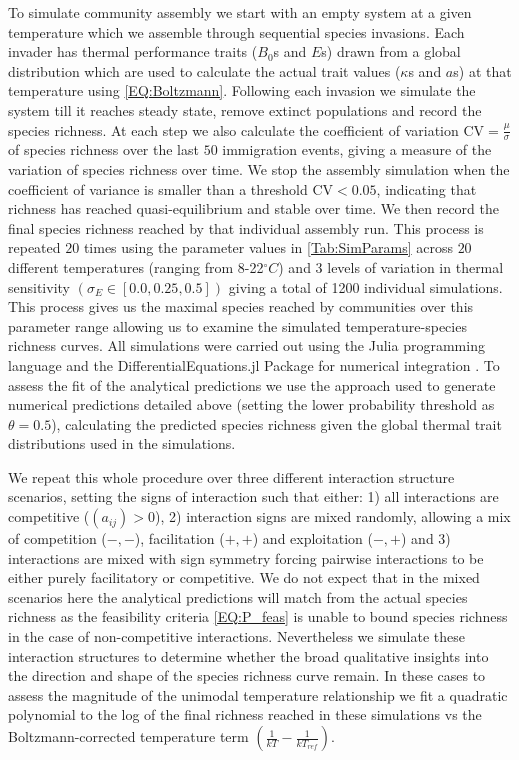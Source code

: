 \documentclass{article}
\begin{document}
To simulate community assembly we start with an empty system at a given temperature which we assemble through sequential species invasions. Each invader has thermal performance traits ($B_0$s and $E$s) drawn from a global distribution which are used to calculate the actual trait values ($\kappa$s and $a$s) at that temperature using \cref{EQ:Boltzmann}. Following each invasion we simulate the system till it reaches steady state, remove extinct populations and record the species richness. At each step we also calculate the coefficient of variation $\text{CV} = \frac{\mu}{\sigma}$ of species richness over the last $50$ immigration events, giving a measure of the variation of species richness over time. We stop the assembly simulation when the coefficient of variance is smaller than a threshold $\text{CV} < 0.05$, indicating that richness has reached quasi-equilibrium and stable over time. We then record the final species richness reached by that individual assembly run. This process is repeated $20$ times using the parameter values in \cref{Tab:SimParams} across $20$ different temperatures (ranging from 8-22$^\circ C$) and 3 levels of variation in thermal sensitivity $(\sigma_E \in [0.0, 0.25, 0.5])$ giving a total of 1200 individual simulations. This process gives us the maximal species reached by communities over this parameter range allowing us to examine the simulated temperature-species richness curves. All simulations were carried out using the Julia programming language and the DifferentialEquations.jl Package for numerical integration \citep{Rackauckas2017}. To assess the fit of the analytical predictions we use the approach used to generate numerical predictions detailed above (setting the lower probability threshold as $\theta = 0.5$), calculating the predicted species richness given the global thermal trait distributions used in the simulations. 

We repeat this whole procedure over three different interaction structure scenarios, setting the signs of interaction such that either: 1) all interactions are competitive ($(a_{ij}) > 0$), 2) interaction signs are mixed randomly, allowing a mix of competition ($-,-$), facilitation ($+,+$) and exploitation ($-,+$) and 3) interactions are mixed with sign symmetry forcing pairwise interactions to be either purely facilitatory or competitive. We do not expect that in the mixed scenarios here the analytical predictions will match from the actual species richness as the feasibility criteria \cref{EQ:P_feas} is unable to bound species richness in the case of non-competitive interactions. Nevertheless we simulate these interaction structures to determine whether the broad qualitative insights into the direction and shape of the species richness curve remain. In these cases to assess the magnitude of the unimodal temperature relationship we fit a quadratic polynomial to the log of the final richness reached in these simulations vs the Boltzmann-corrected temperature term $\left( \frac{1}{kT} - \frac{1}{k T_{ref}} \right)$.
\end{document}
